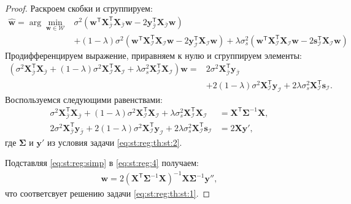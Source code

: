 \begin{proof}
Раскроем скобки и сгруппируем:
\[
\label{eq:st:reg:3}
\begin{aligned}
\hat{\mathbf{w}} = \arg\min_{\mathbf{w}\in \mathcal{W}} &  \sigma^2\left(\mathbf{w}^{\mathsf{T}}\mathbf{X}^{\mathsf{T}}_{\bar{\mathcal{I}}}\mathbf{X}_{\bar{\mathcal{I}}}\mathbf{w} - 2\mathbf{y}^{\mathsf{T}}_{\bar{\mathcal{I}}}\mathbf{X}_{\bar{\mathcal{I}}}\mathbf{w}\right) \\
&+ \left(1-\lambda\right)\sigma^2\left(\mathbf{w}^{\mathsf{T}}\mathbf{X}^{\mathsf{T}}_{\mathcal{I}}\mathbf{X}_{\mathcal{I}}\mathbf{w}- 2\mathbf{y}^{\mathsf{T}}_{\mathcal{I}}\mathbf{X}_{\mathcal{I}}\mathbf{w}\right) + \lambda\sigma^2_s\left(\mathbf{w}^{\mathsf{T}}\mathbf{X}^{\mathsf{T}}_{\mathcal{I}}\mathbf{X}_{\mathcal{I}}\mathbf{w}- 2\mathbf{s}^{\mathsf{T}}_{\mathcal{I}}\mathbf{X}_{\mathcal{I}}\mathbf{w}\right)
\end{aligned}
\]
Продифференцируем выражение, приравняем к нулю и сгруппируем элементы:
\[
\label{eq:st:reg:4}
\begin{aligned}
\left(\sigma^{2}\mathbf{X}^{\mathsf{T}}_{\bar{\mathcal{I}}}\mathbf{X}_{\bar{\mathcal{I}}} + \left(1-\lambda\right)\sigma^2\mathbf{X}^{\mathsf{T}}_{\mathcal{I}}\mathbf{X}_{\mathcal{I}} + \lambda\sigma^{2}_s\mathbf{X}^{\mathsf{T}}_{\mathcal{I}}\mathbf{X}_{\mathcal{I}}\right) \mathbf{w} =& 2\sigma^2\mathbf{X}^{\mathsf{T}}_{\bar{\mathcal{I}}}\mathbf{y}_{\bar{\mathcal{I}}} \\
&+ 2\left(1-\lambda\right)\sigma^2\mathbf{X}^{\mathsf{T}}_{\mathcal{I}}\mathbf{y}_{\mathcal{I}} + 2\lambda\sigma_s^2\mathbf{X}^{\mathsf{T}}_{\mathcal{I}}\mathbf{s}_{\mathcal{I}}.
\end{aligned}
\]
Воспользуемся следующими равенствами:
\[
\label{eq:st:reg:simp}
\begin{aligned}
\sigma^{2}\mathbf{X}^{\mathsf{T}}_{\bar{\mathcal{I}}}\mathbf{X}_{\bar{\mathcal{I}}} + \left(1-\lambda\right)\sigma^2\mathbf{X}^{\mathsf{T}}_{\mathcal{I}}\mathbf{X}_{\mathcal{I}} + \lambda\sigma^{2}_s\mathbf{X}^{\mathsf{T}}_{\mathcal{I}}\mathbf{X}_{\mathcal{I}} &= \mathbf{X}^{\mathsf{T}}\bm{\Sigma}^{-1}\mathbf{X},\\
2\sigma^2\mathbf{X}^{\mathsf{T}}_{\bar{\mathcal{I}}}\mathbf{y}_{\bar{\mathcal{I}}} + 2\left(1-\lambda\right)\sigma^2\mathbf{X}^{\mathsf{T}}_{\mathcal{I}}\mathbf{y}_{\mathcal{I}} + 2\lambda\sigma_s^2\mathbf{X}^{\mathsf{T}}_{\mathcal{I}}\mathbf{s}_{\mathcal{I}} &= 2\mathbf{X}\mathbf{y'},
\end{aligned}
\]
где $\bm{\Sigma}$ и $\mathbf{y'}$ из условия задачи \eqref{eq:st:reg:th:st:2}.

Подставляя \eqref{eq:st:reg:simp} в \eqref{eq:st:reg:4} получаем:
\[
\label{eq:st:reg:5}
\begin{aligned}
\mathbf{w} = 2\left(\mathbf{X}^{\mathsf{T}}\bm{\Sigma}^{-1}\mathbf{X}\right)^{-1}\mathbf{X}\bm{\Sigma}^{-1}\mathbf{y''},
\end{aligned}
\]
что соответсвует решению задачи \eqref{eq:st:reg:th:st:1}.
\end{proof}

